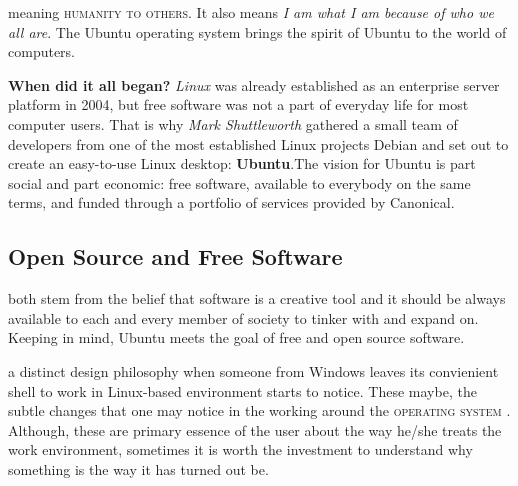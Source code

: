 \documentclass{tufte-book} %
\begin{document}
 meaning \textsc{humanity to others}. It also means \emph{I am what I am because of who we all are}. The Ubuntu operating system brings the spirit of Ubuntu to the world of computers.

\textbf{When did it all began?}
\emph{Linux} was already established as an enterprise server platform in 2004, but free software was not a part of everyday life for most computer users. That is why \textit{Mark Shuttleworth} gathered a small team of developers from one of the most established Linux projects Debian and set out to create an easy-to-use Linux desktop:\textbf{ Ubuntu}.The vision for Ubuntu is part social and part economic: free software, available to everybody on the same terms, and funded through a portfolio of services provided by Canonical.

\subsection[Open Source]{Open Source and Free Software }

both stem from the belief that software is a creative tool and it should be always available to each and every member of society to tinker with and expand on. Keeping in mind, Ubuntu meets the goal of free and open source software. 

 a distinct design philosophy when someone from Windows  leaves its convienient shell to work in Linux-based environment starts to notice. These maybe, the subtle changes that one may notice in the working around the \textsc{operating system }. Although, these are primary essence of the user about the way he/she treats the work environment, sometimes it is worth the investment to understand why something is the way it has turned out be.
\end{document}

